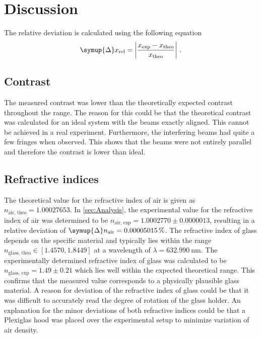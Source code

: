 \section{Discussion}
\label{sec:Discussion}
The relative deviation is calculated using the following equation
\begin{equation*}
    \symup{\Delta} x_{\text{rel}} = \left| \frac{x_{\text{exp}} - x_{{\text{theo}}}}{x_{{\text{theo}}}}\right|\,.
\end{equation*}
\subsection{Contrast}
The measured contrast was lower than the theoretically expected contrast throughout the range. The reason for this could be 
that the theoretical contrast was calculated for an ideal system with the beams exactly aligned. This cannot be achieved in 
a real experiment. Furthermore, the interfering beams had quite a few fringes when observed. This shows that the beams 
were not entirely parallel and therefore the contrast is lower than ideal. 

\subsection{Refractive indices}
The theoretical value for the refractive index of air is given as $n_{\text{air, theo}}=1.00027653$. 
In \autoref{sec:Analysis}, the experimental value for the refractive index of air was determined to be 
$n_{\text{air, exp}} = 1.0002770\pm0.0000013$, resulting in a relative deviation of $\symup{\Delta}n_{\text{air}} = 0.00005015\,\%$. 
The refractive index of 
glass depends on the specific material and typically lies within the range $n_{\text{glass, theo}}\in [1.4570, 1.8449]$ at a 
wavelength of $\lambda = \SI{632.990}{\nano\meter}$. 
The experimentally determined refractive index of glass was calculated to be $n_{\text{glass, exp}} = 1.49\pm0.21$ which lies 
well within the expected theoretical range. 
This confirms that the measured value corresponds to a physically plausible glass material.
A reason for deviation of the refractive index of glass could be that it was difficult to accurately read the degree of rotation 
of the glass holder. 
An explanation for the minor deviations of both refractive indices could be that a Plexiglas hood was placed over the 
experimental setup to minimize 
variation of air density.